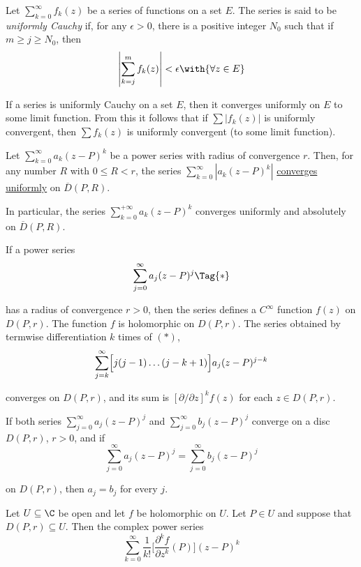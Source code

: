 \label{bfe260e}

Let $\sum_{k=0}^\infty f_k(z)$ be a series of functions on a set $E$. The
series is said to be \textit{uniformly Cauchy} if, for any $\epsilon>0$, there
is a positive integer $N_0$ such that if $m\geq j\geq N_0$, then
$$
  \left|\sum_{k=j}^mf_k(z)\right|<\epsilon\with{\forall z\in E}
$$

If a series is uniformly Cauchy on a set $E$, then it converges uniformly on
$E$ to some limit function. From this it follows that if $\sum|f_k(z)|$ is
uniformly convergent, then $\sum f_k(z)$ is uniformly convergent (to some limit
function).

\Proposition{}\label{ec076c1}

Let $\sum_{k=0}^\infty a_k(z-P)^k$ be a power series with radius of convergence
$r$. Then, for any number $R$ with $0\leq R<r$, the series
$\sum_{k=0}^\infty|a_k(z-P)^k|$ \href{bba67e4}{converges uniformly} on
$\overline D(P,R)$.

In particular, the series $\sum_{k=0}^{+\infty}a_k(z-P)^k$ converges uniformly
and absolutely on $\overline D(P,R)$.

\Lemma{}\label{ccf2595}

If a power series
\begin{equation*}
  \sum_{j=0}^\infty a_j(z-P)^j\Tag{*}
\end{equation*}

has a radius of convergence $r>0$, then the series defines a $C^\infty$
function $f(z)$ on $D(P,r)$. The function $f$ is holomorphic on $D(P,r)$. The
series obtained by termwise differentiation $k$ times of $(*)$,
$$
  \sum_{j=k}^\infty\Bigl[j(j-1)\ldots(j-k+1)\Bigr]a_j(z-P)^{j-k}
$$

converges on $D(P,r)$, and its sum is $[\partial/\partial z]^kf(z)$ for each
$z\in D(P,r)$.

\Proposition{}\label{ea8c930}

If both series $\sum_{j=0}^\infty a_j(z-P)^j$ and $\sum_{j=0}^\infty
b_j(z-P)^j$ converge on a disc $D(P,r)$, $r>0$, and if
$$
  \sum_{j=0}^\infty a_j(z-P)^j=\sum_{j=0}^\infty b_j(z-P)^j
$$

on $D(P,r)$, then $a_j=b_j$ for every $j$.

\label{b43209d}

Let $U\subseteq\C$ be open and let $f$ be holomorphic on $U$. Let $P\in U$ and
suppose that $D(P,r)\subseteq U$. Then the complex power series
$$
  \sum_{k=0}^\infty\frac1{k!}\biggl[\frac{\partial^kf}{\partial z^k}(P)\biggr](z-P)^k
$$

